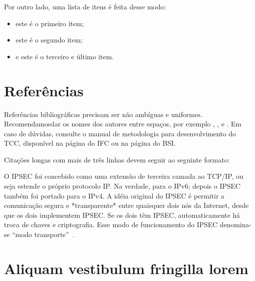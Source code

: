 Por outro lado, uma lista de itens é feita desse modo:

\begin{itemize}
\item este é o primeiro item;
\item este é o segundo item;
\item e este é o terceiro e último item.
\end{itemize}

\section{Referências}

Referências bibliográficas precisam ser não ambíguas e uniformes. Recomendamosdar os nomes dos autores entre espaços, por exemplo \cite{knuth:84},
\cite{boulic:91}, e \cite{smith:99}. Em caso de dúvidas, consulte o manual de metodologia para desenvolvimento do TCC, disponível na página do IFC ou na página do BSI.

Citações longas com mais de três linhas devem seguir ao seguinte formato:

\begin{citacao}
O IPSEC foi concebido como uma extensão de terceira camada ao TCP/IP, ou seja estende o próprio protocolo IP. Na verdade, para o IPv6; depois o IPSEC também foi portado para o IPv4.
A idéia original do IPSEC é permitir a comunicação segura e *transparente* entre quaisquer dois nós da Internet, desde que os dois implementem IPSEC. Se os dois têm IPSEC, automaticamente há troca de chaves e criptografia. Esse modo de funcionamento do IPSEC denomina-se ``modo transporte''~\cite{epx}. 
\end{citacao}

\section{Aliquam vestibulum fringilla lorem}

\lipsum[1]

\lipsum[2-3]
